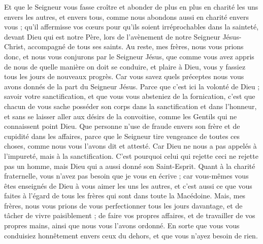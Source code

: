 \begin{multicols}{2}
Et que le Seigneur vous fasse croître et abonder de plus en plus en charité les uns envers les autres, et envers tous, comme nous abondons aussi en charité envers vous ;
qu'il affermisse vos cœurs pour qu'ils soient irréprochables dans la sainteté, devant Dieu qui est notre Père, lors de l'avènement de notre Seigneur Jésus-Christ, accompagné de tous ses saints.
\VerseOne{}Au reste, mes frères, nous vous prions donc, et nous vous conjurons par le Seigneur Jésus, que comme vous avez appris de nous de quelle manière on doit se conduire, et plaire à Dieu, vous y fassiez tous les jours de nouveaux progrès.
Car vous savez quels préceptes nous vous avons donnés de la part du Seigneur Jésus.
Parce que c'est ici la volonté de Dieu ; savoir votre sanctification, et que vous vous absteniez de la fornication,
c'est que chacun de vous sache posséder son corps dans la sanctification et dans l'honneur,
et sans se laisser aller aux désirs de la convoitise, comme les Gentils qui ne connaissent point Dieu.
Que personne n'use de fraude envers son frère et de cupidité dans les affaires, parce que le Seigneur tire vengeance de toutes ces choses, comme nous vous l'avons dit et attesté.
Car Dieu ne nous a pas appelés à l'impureté, mais à la sanctification.
C'est pourquoi celui qui rejette ceci ne rejette pas un homme, mais Dieu qui a aussi donné son Saint-Esprit.
Quant à la charité fraternelle, vous n'avez pas besoin que je vous en écrive ; car vous-mêmes vous êtes enseignés de Dieu à vous aimer les uns les autres,
et c'est aussi ce que vous faites à l'égard de tous les frères qui sont dans toute la Macédoine. Mais, mes frères, nous vous prions de vous perfectionner tous les jours davantage,
et de tâcher de vivre paisiblement ; de faire vos propres affaires, et de travailler de vos propres mains, ainsi que nous vous l'avons ordonné.
En sorte que vous vous conduisiez honnêtement envers ceux du dehors, et que vous n'ayez besoin de rien.

\end{multicols}
